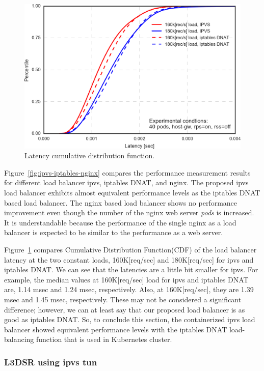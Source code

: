 \begin{figure}[htb]
  \centering
  \includegraphics[width=0.8\columnwidth]{Figs/latency_cdf_rps_40pods}
  \caption{Latency cumulative distribution function.}
  \label{fig:latency_cdf_rps_40pods}
\end{figure}

Figure~\ref{fig:ipvs-iptables-nginx} compares the performance measurement results for different load balancer ipvs, iptables DNAT, and nginx.
The proposed ipvs load balancer exhibits almost equivalent performance levels as the iptables DNAT based load balancer. 
The nginx based load balancer shows no performance improvement even though the number of the nginx web server {\em pods} is increased.
It is understandable because the performance of the single nginx as a load balancer is expected to be similar to the performance as a web server.

Figure~\ref{fig:latency_cdf_rps_40pods} compares Cumulative Distribution Function(CDF) of the load balancer latency at the two constant loads, 160K[req/sec] and 180K[req/sec] for ipvs and iptables DNAT.
We can see that the latencies are a little bit smaller for ipvs.
For example, the median values at 160K[req/sec] load for ipvs and iptables DNAT are, 1.14 msec and 1.24 msec, respectively.
Also, at 160K[req/sec], they are 1.39 msec and 1.45 msec, respectively.
These may not be considered a significant difference; however, we can at least say that our proposed load balancer is as good as iptables DNAT.
So, to conclude this section, the containerized ipvs load balancer showed equivalent performance levels with the iptables DNAT load-balancing function that is used in Kubernetes cluster.

\FloatBarrier

\subsubsection{L3DSR using ipvs tun}

